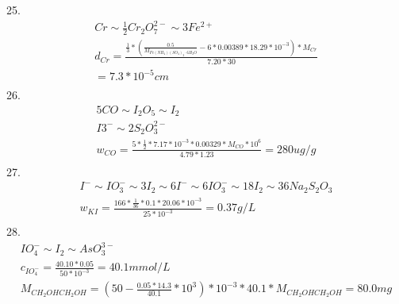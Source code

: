 \documentclass{article}
\begin{document}
25.\begin{equation}
    \begin{multlined}
        Cr \sim \frac{1}{2}Cr_2O_7^{2-} \sim 3 Fe^{2+}\\
        d_{Cr} = \frac{\frac{1}{3}*(\frac{0.5}{M_{Fe(NH_4)(SO_4)_2\cdot6H_2O}} - 6*0.00389*18.29*10^{-3})*M_{Cr}}{7.20*30}\\
        = 7.3*10^{-5} cm\\
    \end{multlined}
\end{equation}
26.\begin{equation}
    \begin{multlined}
        5CO \sim I_2O_5\sim I_2\\
        I3^- \sim 2S_2O_3^{2-}\\
        w_{CO} = \frac{5*\frac{1}{2}*7.17*10^{-3}*0.00329*M_{CO}*10^6}{4.79*1.23} = 280 ug/g\\
    \end{multlined}
\end{equation}
27.\begin{equation}
    \begin{multlined}
        I^-\sim IO_3^- \sim 3I_2\sim 6I^-\sim 6IO_3^-\sim 18I_2\sim 36Na_2S_2O_3\\
        w_{KI} = \frac{166*\frac{1}{36}*0.1*20.06*10^{-3}}{25*10^{-3}} = 0.37 g/L\\
    \end{multlined}
\end{equation}
28.\begin{equation}
    \begin{multlined}
        IO_4^- \sim I_2 \sim AsO_3^{3-}\\
        c_{IO_4^-} = \frac{40.10*0.05}{50*10^{-3}} = 40.1 mmol/L\\
        M_{CH_2OHCH_2OH} = (50 - \frac{0.05*14.3}{40.1}*10^3)*10^{-3}*40.1*M_{CH_2OHCH_2OH} = 80.0mg\\
    \end{multlined}
\end{equation}
\end{document}
